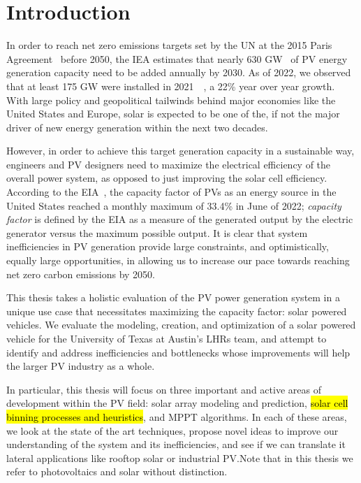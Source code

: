 \chapter{Introduction}

In order to reach net zero emissions targets set by the \ac{UN} at the
2015 Paris Agreement~\cite{UN_Paris_agreement} before 2050, the \ac{IEA}
estimates that nearly 630 \ac{GW}~\cite{IEA_roadmap} of \ac{PV} energy
generation capacity need to be added annually by 2030. As of 2022, we observed
that at least 175 GW were installed in 2021~\cite{IEA_trends}~\cite{IEA_snapshot}, a 22\% year over year growth. With large policy and
geopolitical tailwinds behind major economies like the United States and Europe,
solar is expected to be one of the, if not the major driver of new energy
generation within the next two decades.

However, in order to achieve this target generation capacity in a sustainable
way, engineers and \ac{PV} designers need to maximize the electrical
efficiency of the overall power system, as opposed to just improving the solar
cell efficiency. According to the \ac{EIA}~\cite{EIA_capacity}, the capacity
factor of \ac{PV}s as an energy source in the United States reached a
monthly maximum of 33.4\% in June of 2022; \textit{capacity factor} is defined
by the \ac{EIA} as a measure of the generated output by the electric generator
versus the maximum possible output. It is clear that system inefficiencies in
\ac{PV} generation provide large constraints, and optimistically, equally
large opportunities, in allowing us to increase our pace towards reaching net
zero carbon emissions by 2050.

This thesis takes a holistic evaluation of the \ac{PV} power generation
system in a unique use case that necessitates maximizing the capacity factor:
solar powered vehicles. We evaluate the modeling, creation, and optimization of
a solar powered vehicle for the University of Texas at Austin's \ac{LHRs} team,
and attempt to identify and address inefficiencies and bottlenecks whose
improvements will help the larger \ac{PV} industry as a whole.

In particular, this thesis will focus on three important and active areas of
development within the \ac{PV} field: solar array modeling and prediction,
\hl{solar cell binning processes and heuristics},
and \ac{MPPT} algorithms.
In each of these areas, we look at the state of the art techniques, propose novel
ideas to improve our understanding of the system and its inefficiencies, and see
if we can translate it lateral applications like rooftop solar or industrial
\ac{PV}.\@ Note that in this thesis we refer to photovoltaics and solar without
distinction.

